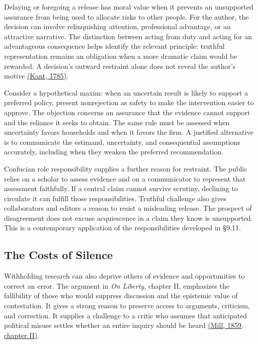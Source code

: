 \noindent \noindent Delaying or foregoing a release has moral value when it
prevents an unsupported assurance from being used to allocate risks to
other people. For the author, the decision can involve relinquishing
attention, professional advantage, or an attractive narrative. The
distinction between acting from duty and acting for an advantageous
consequence helps identify the relevant principle: truthful
representation remains an obligation when a more dramatic claim would be
rewarded. A decision's outward restraint alone does not reveal the
author's motive
\href{https://www.gutenberg.org/files/5682/5682-h/5682-h.htm}{(Kant,
1785)}.

Consider a hypothetical maxim: when an uncertain result is likely to
support a preferred policy, present nonrejection as safety to make the
intervention easier to approve. The objection concerns an assurance that
the evidence cannot support and the reliance it seeks to obtain. The
same rule must be assessed when uncertainty favors households and when
it favors the firm. A justified alternative is to communicate the
estimand, uncertainty, and consequential assumptions accurately,
including when they weaken the preferred recommendation.

Confucian role responsibility supplies a further reason for restraint.
The public relies on a scholar to assess evidence and on a communicator
to represent that assessment faithfully. If a central claim cannot
survive scrutiny, declining to circulate it can fulfill those
responsibilities. Truthful challenge also gives collaborators and
editors a reason to resist a misleading release. The prospect of
disagreement does not excuse acquiescence in a claim they know is
unsupported. This is a contemporary application of the responsibilities
developed in §9.11.

\hypertarget{M09-the-costs-of-silence}{%
\subsection{The Costs of Silence}\label{M09-the-costs-of-silence}}

\noindent \noindent Withholding research can also deprive others of evidence and
opportunities to correct an error. The argument in \emph{On Liberty},
chapter II, emphasizes the fallibility of those who would suppress
discussion and the epistemic value of contestation. It gives a strong
reason to preserve access to arguments, criticism, and correction. It
supplies a challenge to a critic who assumes that anticipated political
misuse settles whether an entire inquiry should be heard
\href{https://dhspriory.org/kenny/PhilTexts/Mill/Liberty2.html}{(Mill,
1859, chapter II)}.

